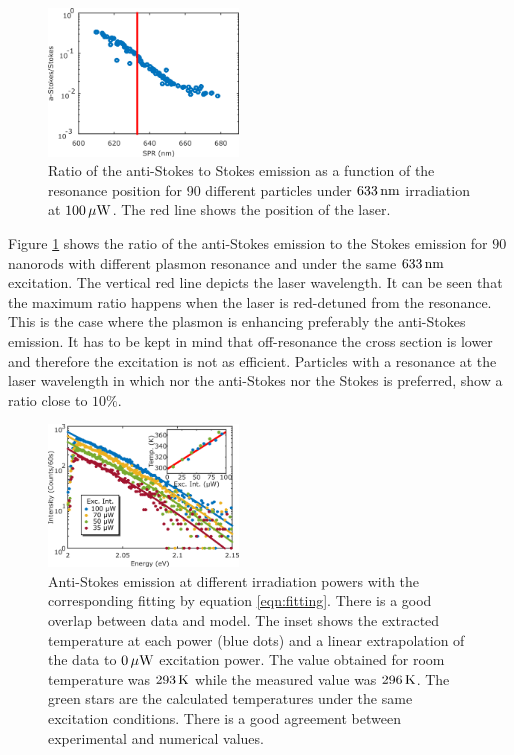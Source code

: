\begin{figure}[htp] \centering
\includegraphics[width=0.45\textwidth]{Chapters/04_Anti-Stokes/Figures/Supplementary/02_AS_vs_S_SPR/02_AS_vs_S_SPR.png}
\caption{Ratio of the anti-Stokes to Stokes emission as a function of the
resonance position for 90 different particles under $633\,\textrm{nm}$
irradiation at $100\,\mu\textrm{W}$. The red line shows the position of the laser.}
	\label{fig:ASS-ratio}
\end{figure}

Figure \ref{fig:ASS-ratio} shows the ratio of the anti-Stokes emission to the
Stokes emission for $90$ nanorods with different plasmon resonance and under the
same $633\,\textrm{nm}$ excitation. The vertical red line depicts the laser wavelength. It
can be seen that the maximum ratio happens when the laser is red-detuned from
the resonance. This is the case where the plasmon is enhancing preferably the
anti-Stokes emission. It has to be kept in mind that off-resonance the cross
section is lower and therefore the excitation is not as efficient. Particles
with a resonance at the laser wavelength in which nor the anti-Stokes nor the
Stokes is preferred, show a ratio close to $10\%$.

\begin{figure}[htp] \centering
\includegraphics[width=0.45\textwidth]{Chapters/04_Anti-Stokes/Figures/03_Fit_Of_AS/03_Log_Fit_AS.png}
\caption{Anti-Stokes emission at different irradiation powers with the
corresponding fitting by equation \ref{eqn:fitting}. There is a good overlap
between data and model. The inset shows the extracted temperature at each
power (blue dots) and a linear extrapolation of the data to $0\,\mu\textrm{W}$ excitation
power. The value obtained for room temperature was $293\,\textrm{K}$ while the measured
value was $296\,\textrm{K}$. The green stars are the calculated temperatures under the
same excitation conditions. There is a good agreement between experimental and
numerical values.}
	\label{fig:AS_in_Log}
\end{figure}

